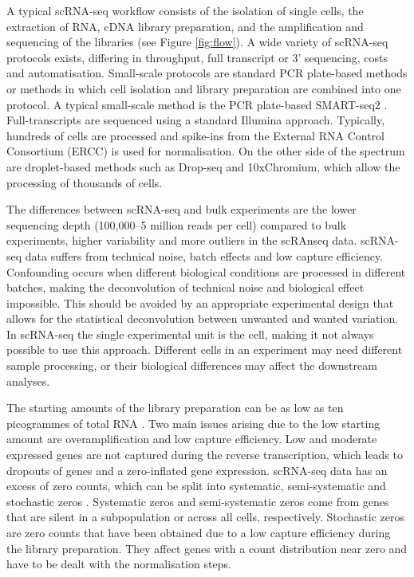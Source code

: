 \documentclass[11pt, a4paper]{article}\usepackage[]{graphicx}\usepackage[]{color}
\begin{document}
A typical scRNA-seq workflow consists of the isolation of single cells, the extraction of RNA, cDNA library preparation, and the amplification and sequencing of the libraries (see Figure {\ref{fig:flow}}). A wide variety of scRNA-seq protocols exists, differing in throughput, full transcript or 3' sequencing, costs and automatisation. Small-scale protocols are standard PCR plate-based methods or methods in which cell isolation and library preparation are combined into one protocol. A typical small-scale method is the PCR plate-based SMART-seq2 \citep{picelli2013smart}. Full-transcripts are sequenced using a standard Illumina approach. Typically, hundreds of cells are processed and spike-ins from the External RNA Control Consortium (ERCC) is used for normalisation. On the other side of the spectrum are droplet-based methods such as Drop-seq and 10xChromium, which allow the processing of thousands of cells.

The differences between scRNA-seq and bulk experiments are the lower sequencing depth (100,000--5 million reads per cell) compared to bulk experiments, higher variability and more outliers in the scRAnseq data. scRNA-seq data suffers from technical noise, batch effects and low capture efficiency. Confounding occurs when different biological conditions are processed in different batches, making the deconvolution of technical noise and biological effect impossible. This should be avoided by an appropriate experimental design that allows for the statistical deconvolution between unwanted and wanted variation. In scRNA-seq the single experimental unit is the cell, making it not always possible to use this approach. Different cells in an experiment may need different sample processing, or their biological differences may affect the downstream analyses.

The starting amounts of the library preparation can be as low as ten picogrammes of total RNA \citep{picelli2013smart}. Two main issues arising due to the low starting amount are  overamplification and low capture efficiency. Low and moderate expressed genes are not captured during the reverse transcription, which leads to dropouts of genes and a zero-inflated gene expression. scRNA-seq data has an excess of zero counts, which can be split into systematic, semi-systematic and stochastic zeros \citep{lun2016pooling}. Systematic zeros and semi-systematic zeros come from genes that are silent in a subpopulation or across all cells, respectively. 
Stochastic zeros are zero counts that have been obtained due to a low capture efficiency during the library preparation. They affect genes with a count distribution near zero and have to be dealt with the normalisation steps.  
 
\end{document}
